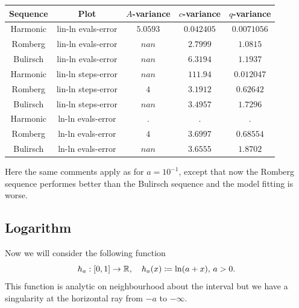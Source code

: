 \begin{table}[H]
    \centering
    \begin{tabular}{c|c||c|c|c}
Sequence & Plot & \(A\)-variance & \(c\)-variance & \(q\)-variance\\\hline
Harmonic & lin-ln evals-error & \(5.0593\) & \(0.042405\) & \(0.0071056\) \\
Romberg & lin-ln evals-error & \(nan\) & \(2.7999\) & \(1.0815\) \\
Bulirsch & lin-ln evals-error & \(nan\) & \(6.3194\) & \(1.1937\) \\
Harmonic & lin-ln steps-error & \(nan\) & \(111.94\) & \(0.012047\) \\
Romberg & lin-ln steps-error & \(4\) & \(3.1912\) & \(0.62642\) \\
Bulirsch & lin-ln steps-error & \(nan\) & \(3.4957\) & \(1.7296\) \\
Harmonic & ln-ln evals-error & . & . & . \\
Romberg & ln-ln evals-error & \(4\) & \(3.6997\) & \(0.68554\) \\
Bulirsch & ln-ln evals-error & \(nan\) & \(3.6555\) & \(1.8702\) \\
    \end{tabular}
    \label{tab:my_label}
\end{table}

Here the same comments apply as for \(a = 10^{-1}\), except that now the Romberg sequence performes better than the Bulirsch sequence and the model fitting is worse.

\subsection{Logarithm}

Now we will consider the following function 
\[
h_a: [0, 1] \rightarrow \mathbb{R}, \quad h_a(x) \coloneqq \ln(a + x),\, a > 0.
\]
This function is analytic on neighbourhood about the interval but we have a singularity at the horizontal ray from \(-a\) to \(-\infty\).


